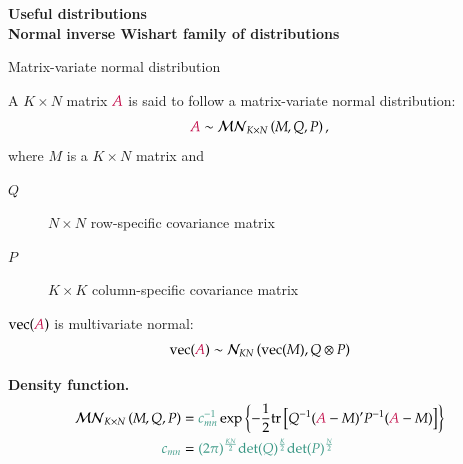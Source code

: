 \documentclass[notes,blackandwhite,mathsans,usenames,dvipsnames]{beamer}
\begin{document}
{
\begin{frame}

\begin{adjustwidth}{-0.5cm}{0cm}
\vspace{7.8cm}\Large
\textbf{{\color{mcxs1}Useful distributions}\\ {\color{mcxs4}Normal inverse Wishart family of distributions}}
\end{adjustwidth}

\end{frame}
}

\begin{frame}{Matrix-variate normal distribution}

{\color{mcxs2}A} $K\times N$ {\color{mcxs2}matrix} ${\color{purple}A}$ {\color{mcxs2}is said to follow a} {\color{mcxs1}matrix-variate normal} {\color{mcxs2}distribution:}
$$ {\color{purple}A} \sim \mathcal{MN}_{K\times N}\left( M, Q, P \right), $$ 
{\color{mcxs2}where} $M$ {\color{mcxs2}is a} $K\times N$  {\color{mcxs2}matrix and} 
\begin{description}
\item[$Q$] $N\times N$ {\color{mcxs2}row-specific covariance matrix} 
\item[$P$] $K\times K$ {\color{mcxs2}column-specific covariance matrix}
\end{description}

 $\text{vec}({\color{purple}A})$ {\color{mcxs2}is multivariate normal:}
$$ \text{vec}({\color{purple}A}) \sim \mathcal{N}_{KN}\left( \text{vec}(M), Q\otimes P \right) $$ 

\bigskip
\textbf{Density function.}  
\begin{align*}
\mathcal{MN}_{K\times N}\left( M, Q, P \right) &= {\color{mcxs2}c_{mn}^{-1}}\exp\left\{ -\frac{1}{2}\text{tr}\left[ Q^{-1}({\color{purple}A}-M)'P^{-1}({\color{purple}A}-M) \right] \right\}\\
{\color{mcxs2}c_{mn}} &= {\color{mcxs2}(2\pi)^{\frac{KN}{2}}\text{det}(Q)^{\frac{K}{2}}\text{det}(P)^{\frac{N}{2}} }
\end{align*}
\end{frame}
\end{document}
